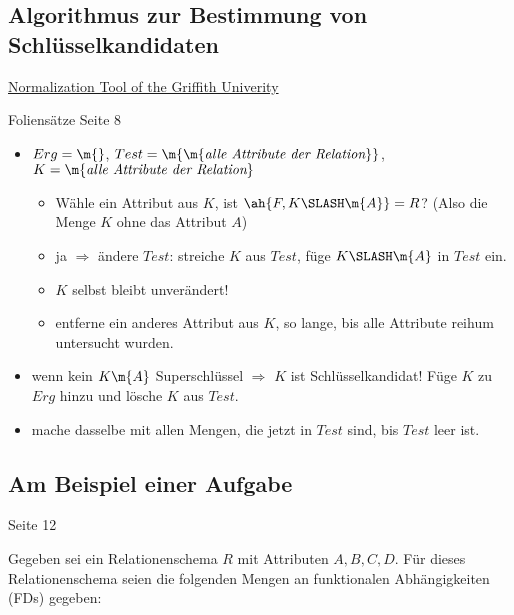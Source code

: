\documentclass{lehramt-informatik-haupt}
\begin{document}
%

\subsection{Algorithmus zur Bestimmung von Schlüsselkandidaten}

\href{http://www.ict.griffith.edu.au/normalization_tools/normalization/ind.php}
{Normalization Tool of the Griffith Univerity}

Foliensätze Seite 8

\begin{itemize}
\item
$Erg = \m{}$,
$Test = \m{\m{\textit{alle Attribute der Relation}}}$,
$K = \m{\textit{alle Attribute der Relation}}$

\begin{itemize}
\item Wähle ein Attribut aus $K$, ist
$\ah{F,K \SLASH \m{A}} = R$?
(Also die Menge $K$ ohne das Attribut $A$)

\item ja $\Rightarrow$ ändere $\textit{Test}$:
streiche $K$ aus $\textit{Test}$, füge $K \SLASH \m{A}$ in $\textit{Test}$ ein.

\item $K$ selbst bleibt unverändert!

\item entferne ein anderes Attribut aus $K$, so lange, bis alle
Attribute reihum untersucht wurden.
\end{itemize}

\item wenn kein $K\m{A}$ Superschlüssel $\Rightarrow$
$K$ ist Schlüsselkandidat!
Füge $K$ zu $Erg$ hinzu und lösche $K$ aus $\textit{Test}$.

\item mache dasselbe mit allen Mengen, die jetzt in $\textit{Test}$ sind,
bis $\textit{Test}$ leer ist.

\end{itemize}

\subsection{Am Beispiel einer Aufgabe}

Seite 12

Gegeben sei ein Relationenschema $R$ mit Attributen $A, B, C, D$. Für
dieses Relationenschema seien die folgenden Mengen an funktionalen
Abhängigkeiten (FDs) gegeben:
\end{document}
